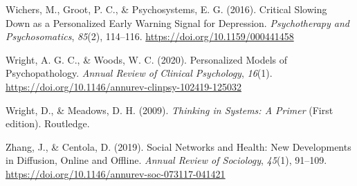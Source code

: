 \documentclass[
  british,
  man,floatsintext]{apa6}
\begin{document}
\leavevmode\hypertarget{ref-wichersCriticalSlowingPersonalized2016}{}%
Wichers, M., Groot, P. C., \& Psychosystems, E. G. (2016). Critical Slowing Down as a Personalized Early Warning Signal for Depression. \emph{Psychotherapy and Psychosomatics}, \emph{85}(2), 114--116. \url{https://doi.org/10.1159/000441458}

\leavevmode\hypertarget{ref-wrightPersonalizedModelsPsychopathology2020a}{}%
Wright, A. G. C., \& Woods, W. C. (2020). Personalized Models of Psychopathology. \emph{Annual Review of Clinical Psychology}, \emph{16}(1). \url{https://doi.org/10.1146/annurev-clinpsy-102419-125032}

\leavevmode\hypertarget{ref-wrightThinkingSystemsPrimer2009}{}%
Wright, D., \& Meadows, D. H. (2009). \emph{Thinking in Systems: A Primer} (First edition). Routledge.

\leavevmode\hypertarget{ref-zhangSocialNetworksHealth2019}{}%
Zhang, J., \& Centola, D. (2019). Social Networks and Health: New Developments in Diffusion, Online and Offline. \emph{Annual Review of Sociology}, \emph{45}(1), 91--109. \url{https://doi.org/10.1146/annurev-soc-073117-041421}

\endgroup
\end{document}
